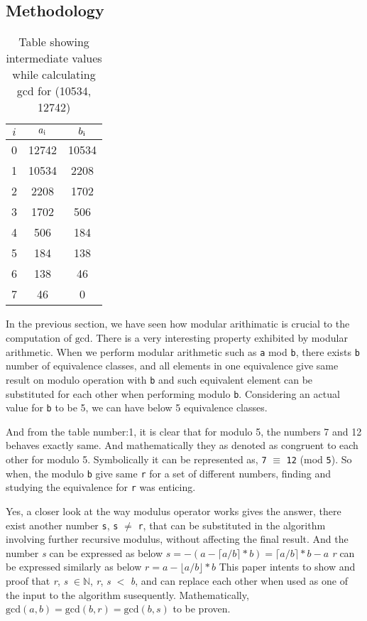 \documentclass[12pt]{article}
\newcommand{\N}{{\mathbb N}}
\renewcommand{\gcd}{\text{gcd}}
\newcommand{\ceil}[1]{\lceil#1\rceil}
\newcommand{\floor}[1]{\lfloor#1\rfloor}
\begin{document}
\begin{multicols}{2}
\section{Methodology}
\begin{table*}[t]
\centering
	\begin{tabular}{c | c | c}
		\hline
		$i$ & $a\textsubscript{i}$ & $b\textsubscript{i}$ \\ [0.5ex] 
		\hline
		0 & 12742 & 10534 \\ 
		1 & 10534 & 2208 \\  
		2 & 2208  & 1702 \\
		3 & 1702  & 506 \\
		4 & 506   & 184 \\
		5 & 184   & 138 \\
		6 & 138   & 46 \\
		7 & 46    & 0
	\end{tabular}
\caption{Table showing intermediate values while calculating gcd for (10534, 12742)}
\label{table:2}
\end{table*}
In the previous section, we have seen how modular arithimatic is crucial to the computation of $\gcd$. There is a very interesting property exhibited by modular arithmetic.
When we perform modular arithmetic such as \texttt{a} mod \texttt{b}, there exists
\texttt{b} number of equivalence classes, and all elements in one equivalence give same result on modulo operation with \texttt{b} and such equivalent element can be substituted for each other when performing modulo \texttt{b}.
\newline
Considering an actual value for \texttt{b} to be 5, we can have below 5 equivalence classes.

And from the table number:1, it is clear that for modulo 5, the numbers 7 and 12 behaves exactly same. And mathematically they as denoted as congruent to each other for modulo 5.
Symbolically it can be represented as, \texttt{7} $\equiv$ \texttt{12} (mod \texttt{5}).
So when, the modulo \texttt{b} give same \texttt{r} for a set of different numbers, finding and studying the equivalence for \texttt{r} was enticing.

Yes, a closer look at the way modulus operator works gives the answer, there exist another  number \texttt{s}, \texttt{s} $\neq$ \texttt{r}, that can be substituted in the algorithm involving further recursive modulus, without affecting the final result. And the number \textit{s} can be expressed as below
\newline $s = -(a-\ceil{a/b}*b) = \ceil{a/b}*b - a$
\newline \textit{r} can be expressed similarly as below
\newline $r = a - \floor{a/b}*b$
\newline This paper intents to show and proof that \textit{r}, \textit{s} $\in \N$, \textit{r}, \textit{s} $<$ \textit{b}, and can replace each other when used as one of the input to the algorithm susequently. Mathematically, $\gcd(a,b) =\gcd(b,r) = \gcd(b,s)$ to be proven.


\end{multicols}
\end{document}
